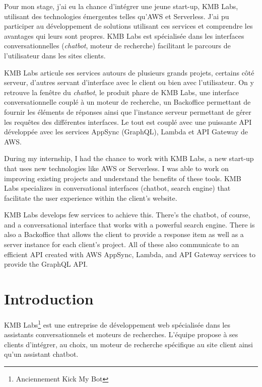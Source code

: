 \documentclass[12pt,a4paper,oneside]{scrreprt}
\newenvironment{abstractpage}
{\cleardoublepage\vspace*{\fill}\thispagestyle{empty}}
{\vfill\cleardoublepage}
\renewenvironment{abstract}[1]
{\bigskip\selectlanguage{#1}%
	\begin{center}\bfseries\abstractname\end{center}}
{\par\bigskip}
\begin{document}
\begin{abstractpage}
	\begin{abstract}{french}
		Pour mon stage, j'ai eu la chance d'intégrer une jeune start-up, KMB Labs, utilisant des technologies émergentes telles qu'AWS et Serverless. J'ai pu participer au développement de solutions utilisant ces services et comprendre les avantages qui leurs sont propres. KMB Labs est spécialisée dans les interfaces conversationnelles (\textit{chatbot}, moteur de recherche) facilitant le parcours de l'utilisateur dans les sites clients.

		KMB Labs articule ses services autours de plusieurs grands projets, certains côté serveur, d'autres servant d'interface avec le client ou bien avec l'utilisateur. On y retrouve la fenêtre du \textit{chatbot}, le produit phare de KMB Labs, une interface conversationnelle couplé à un moteur de recherche, un Backoffice permettant de fournir les éléments de réponses ainsi que l'instance serveur permettant de gérer les requêtes des différentes interfaces. Le tout est couplé avec une puissante API développée avec les services AppSync (GraphQL), Lambda et API Gateway de AWS.
	\end{abstract}

	\begin{abstract}{english}
		During my internship, I had the chance to work with KMB Labs, a new start-up that uses new technologies like AWS or Serverless. I was able to work on improving existing projects and understand the benefits of these tools. KMB Labs specializes in conversational interfaces (chatbot, search engine) that facilitate the user experience within the client's website.

		KMB Labs develops few services to achieve this. There's the chatbot, of course, and a conversational interface that works with a powerful search engine. There is also a Backoffice that allows the client to provide a response item as well as a server instance for each client's project. All of these also communicate to an efficient API created with AWS AppSync, Lambda, and API Gateway services to provide the GraphQL API.
	\end{abstract}
\end{abstractpage}


\chapter*{Introduction}
KMB Labs\footnote{Anciennement Kick My Bot} est une entreprise de développement web spécialisée dans les assistants conversationnels et moteurs de recherches. L'équipe propose à ses clients d'intégrer, au choix, un moteur de recherche spécifique au site client ainsi qu'un assistant chatbot.
\end{document}

